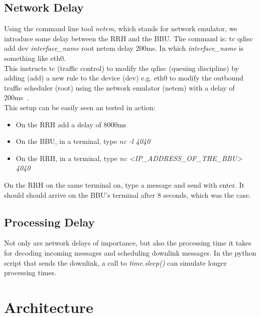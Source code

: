 \subsection{Network Delay}
Using the command line tool \emph{netem}, which stands for network emulator, we introduce some delay between the RRH and the BBU.
The command is: tc qdisc add dev \emph{interface\_name} root netem delay 200ms. In which \emph{interface\_name} is something like 
eth0. 
\\
This instructs tc (traffic control) to modify the qdisc (queuing discipline) by 
adding (add) a new rule to the device (dev) e.g. eth0 to modify the outbound traffic scheduler (root) using 
the network emulator (netem) with a delay of 200ms~\cite{netem}.
\\
This setup can be easily seen an tested in action:
\begin{itemize}
    \item On the RRH add a delay of 8000ms
    \item On the BBU, in a terminal, type \emph{nc -l 4040}
    \item On the RRH, in a terminal, type \emph{nc <\emph{IP\_ADDRESS\_OF\_THE\_BBU}> 4040}
\end{itemize}

On the RRH on the same terminal on, type a message and send with enter. It should should arrive on the BBU's terminal 
after 8 seconds, which was the case. 

\subsection{Processing Delay}
Not only are network delays of importance, but also the processing time it takes for decoding incoming messages and scheduling downlink messages.
In the python script that sends the downlink, a call to \emph{time.sleep()} can simulate longer processing times.

\section{Architecture}
